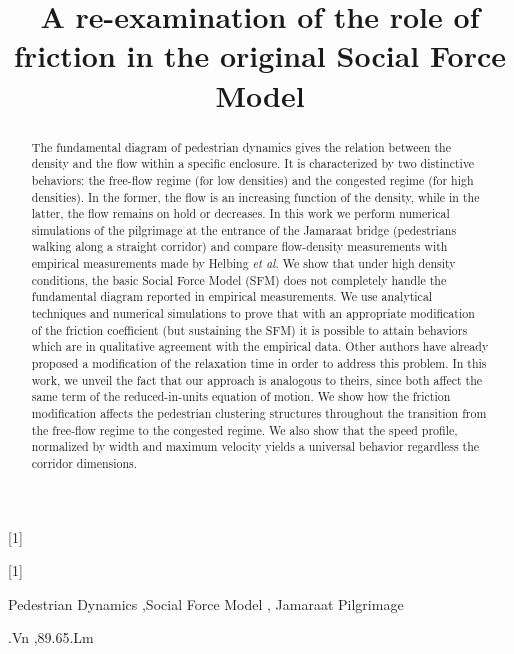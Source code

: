 \documentclass[preprint,12pt]{elsarticle}
\begin{document}
\newcommand*{\hwplotB}{\raisebox{3pt}{\tikz{\draw[red,dashed,line 
width=3.2pt](0,0) -- 
(5mm,0);}}}

\newrobustcmd*{\mydiamond}[1]{}

\newrobustcmd*{\mytriangleleft}[1]{}

\begin{frontmatter}


\title{A re-examination of the role of friction in the original Social Force Model}


\begin{abstract}
The fundamental diagram of pedestrian dynamics gives the relation between the density and the flow within a specific enclosure. It is characterized by two distinctive behaviors: the free-flow regime (for low densities) and the congested regime (for high densities). In the former, the flow is an increasing function of the density, while in the latter, the flow remains on hold or decreases. In this work we perform numerical simulations of the pilgrimage at the entrance of the Jamaraat bridge (pedestrians walking along a straight corridor) and compare flow-density measurements with empirical measurements made by Helbing \textit{et al}. We show that under high density conditions, the basic Social Force Model (SFM) does not completely handle the fundamental diagram reported in empirical measurements. We use analytical techniques and numerical simulations to prove that with an appropriate modification of the friction coefficient (but sustaining the SFM) it is possible to attain behaviors which are in qualitative agreement with the empirical data. Other authors have already proposed a modification of the relaxation time in order to address this problem. In this work, we unveil the fact that our approach is analogous to theirs, since both affect the same term of the reduced-in-units equation of motion. We show how the friction modification affects the pedestrian clustering structures throughout the transition from the free-flow regime to the congested regime. We also show that the speed profile, normalized by width and maximum velocity yields a universal behavior regardless the corridor dimensions. \\
\end{abstract}

\begin{keyword}

Pedestrian Dynamics \sep Social Force Model \sep 
Jamaraat Pilgrimage


.Vn \sep 89.65.Lm

\end{keyword}

\end{frontmatter}
\end{document}
